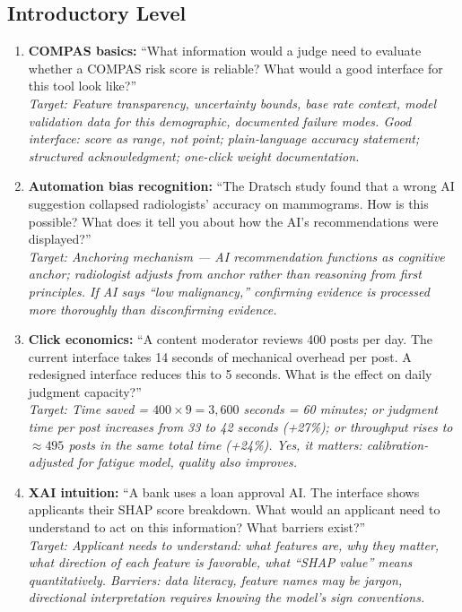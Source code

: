 \subsection{Introductory Level}

\begin{enumerate}
    \item \textbf{COMPAS basics:} ``What information would a judge need to evaluate whether a COMPAS risk score is reliable? What would a good interface for this tool look like?''\\
    \textit{Target: Feature transparency, uncertainty bounds, base rate context, model validation data for this demographic, documented failure modes. Good interface: score as range, not point; plain-language accuracy statement; structured acknowledgment; one-click weight documentation.}

    \item \textbf{Automation bias recognition:} ``The Dratsch study found that a wrong AI suggestion collapsed radiologists' accuracy on mammograms. How is this possible? What does it tell you about how the AI's recommendations were displayed?''\\
    \textit{Target: Anchoring mechanism --- AI recommendation functions as cognitive anchor; radiologist adjusts from anchor rather than reasoning from first principles. If AI says ``low malignancy,'' confirming evidence is processed more thoroughly than disconfirming evidence.}

    \item \textbf{Click economics:} ``A content moderator reviews 400 posts per day. The current interface takes 14 seconds of mechanical overhead per post. A redesigned interface reduces this to 5 seconds. What is the effect on daily judgment capacity?''\\
    \textit{Target: Time saved = $400 \times 9 = 3,600$ seconds = 60 minutes; or judgment time per post increases from 33 to 42 seconds (+27\%); or throughput rises to $\approx 495$ posts in the same total time (+24\%). Yes, it matters: calibration-adjusted for fatigue model, quality also improves.}

    \item \textbf{XAI intuition:} ``A bank uses a loan approval AI. The interface shows applicants their SHAP score breakdown. What would an applicant need to understand to act on this information? What barriers exist?''\\
    \textit{Target: Applicant needs to understand: what features are, why they matter, what direction of each feature is favorable, what ``SHAP value'' means quantitatively. Barriers: data literacy, feature names may be jargon, directional interpretation requires knowing the model's sign conventions.}
\end{enumerate}

